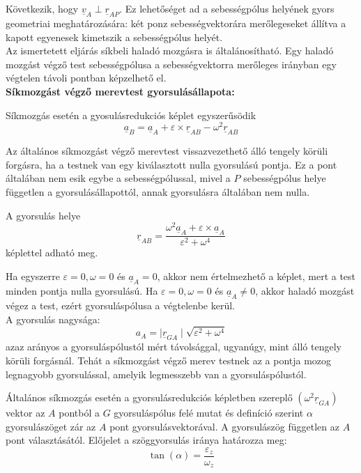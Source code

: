  Következik, hogy \(\underline{v}_A \perp \underline{r}_{AP}\). Ez lehetőséget ad a sebességpólus helyének gyors geometriai meghatározására: két ponz sebességvektorára merőlegeseket állítva a kapott egyenesek kimetszik a sebességpólus helyét.\\
 Az ismertetett eljárás síkbeli haladó mozgásra is általánosítható. Egy haladó mozgást végző test sebességpólusa a sebességvektorra merőleges irányban egy végtelen távoli pontban képzelhető el.
 \\
 \textbf{Síkmozgást végző merevtest gyorsulásállapota:}
 \begin{tcolorbox}[colback=MidnightBlue!5!white,colframe=MidnightBlue!60!black,title= Tétel]
    Síkmozgás esetén a gyosulásredukciós képlet egyszerűsödik
    $$\underline{a}_B = \underline{a}_A + \varepsilon \times \underline{r}_{AB} - \omega^2 \underline{r}_{AB}$$
 \end{tcolorbox}
 Az általános síkmozgást végző merevtest vissazvezethető álló tengely körüli forgásra, ha a testnek van egy kiválasztott nulla gyorsulású pontja. Ez a pont általában nem esik egybe a sebességpólussal, mivel a \(P\) sebességpólus helye független a gyorsulásállapottól, annak gyorsulásra általában nem nulla.
 \begin{tcolorbox}[colback=MidnightBlue!5!white,colframe=MidnightBlue!60!black,title= Definíció]
    A gyorsulás helye
    $$\underline{r}_{AB} = \dfrac{\omega^2\underline{a}_A + \varepsilon \times \underline{a}_A}{\varepsilon^2 + \omega^4}$$
    képlettel adható meg.
 \end{tcolorbox}
Ha egyszerre \(\varepsilon = 0, \omega = 0\) és \(\underline{a}_A = 0\), akkor nem értelmezhető a képlet, mert a test minden pontja nulla gyorsulású. Ha \(\varepsilon =0, \omega = 0\) és \(\underline{a}_A \neq 0\), akkor haladó mozgást végez a test, ezért gyorsuláspólusa a végtelenbe kerül.\\
A gyorsulás nagysága:
$$a_A = \mid \underline{r}_{GA} \mid \sqrt{\varepsilon^2 + \omega^4}$$
azaz arányos a gyorsuláspólustól mért távolsággal, ugyanúgy, mint álló tengely körüli forgásnál. Tehát a síkmozgást végző merev testnek az a pontja mozog legnagyobb gyorsulással, amelyik legmesszebb van a gyorsuláspólustól.
\begin{tcolorbox}[colback=MidnightBlue!5!white,colframe=MidnightBlue!60!black,title= Definíció]
    Általános síkmozgás esetén a gyorsulásredukciós képletben szereplő \((\omega^2 \underline{r}_{GA})\) vektor az \(A\) pontból a \(G\) gyorsuláspólus felé mutat és definíció szerint \(\alpha \) gyorsulászöget zár az \(A\) pont gyorsulásvektorával. A gyorsulászög független az \(A\) pont választásától. Előjelet a szöggyorsulás iránya határozza meg:
    $$\tan(\alpha) = \dfrac{\varepsilon_z}{\omega_z}$$
\end{tcolorbox}
